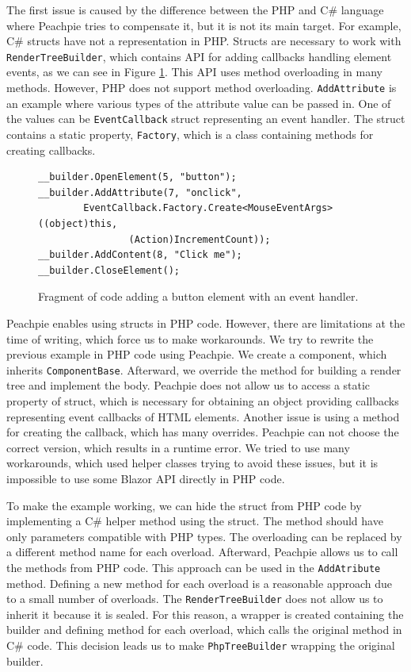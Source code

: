 The first issue is caused by the difference between the PHP and C\# language where Peachpie tries to compensate it, but it is not its main target. 
For example, C\# structs have not a representation in PHP.
Structs are necessary to work with \texttt{RenderTreeBuilder}, which contains API for adding callbacks handling element events, as we can see in Figure \ref{img14:callback}.
This API uses method overloading in many methods.
However, PHP does not support method overloading.
\texttt{AddAttribute} is an example where various types of the attribute value can be passed in.
One of the values can be \texttt{EventCallback} struct representing an event handler.
The struct contains a static property, \texttt{Factory}, which is a class containing methods for creating callbacks.
\par
\begin{figure}[b!]
\begin{lstlisting}
__builder.OpenElement(5, "button");
__builder.AddAttribute(7, "onclick", 
		EventCallback.Factory.Create<MouseEventArgs>((object)this, 
				(Action)IncrementCount));
__builder.AddContent(8, "Click me");
__builder.CloseElement();
\end{lstlisting}
\caption{Fragment of code adding a button element with an event handler.}
\label{img14:callback}
\end{figure}
\par
Peachpie enables using structs in PHP code. 
However, there are limitations at the time of writing, which force us to make workarounds.
We try to rewrite the previous example in PHP code using Peachpie.
We create a component, which inherits \texttt{ComponentBase}. 
Afterward, we override the method for building a render tree and implement the body.
Peachpie does not allow us to access a static property of struct, which is necessary for obtaining an object providing callbacks representing event callbacks of HTML elements.
Another issue is using a method for creating the callback, which has many overrides.
Peachpie can not choose the correct version, which results in a runtime error.
We tried to use many workarounds, which used helper classes trying to avoid these issues, but it is impossible to use some Blazor API directly in PHP code.
\par
To make the example working, we can hide the struct from PHP code by implementing a C\# helper method using the struct.
The method should have only parameters compatible with PHP types. 
The overloading can be replaced by a different method name for each overload.
Afterward, Peachpie allows us to call the methods from PHP code.
This approach can be used in the \texttt{AddAtribute} method. 
Defining a new method for each overload is a reasonable approach due to a small number of overloads.
The \texttt{RenderTreeBuilder} does not allow us to inherit it because it is sealed.
For this reason, a wrapper is created containing the builder and defining method for each overload, which calls the original method in C\# code.
This decision leads us to make \texttt{PhpTreeBuilder} wrapping the original builder.

